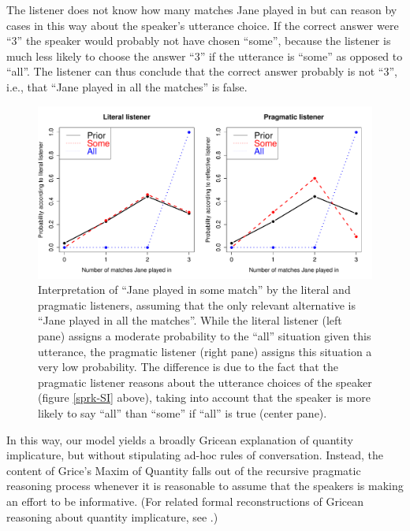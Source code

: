\documentclass[pdfextras]{handbook}
\begin{document}
The listener does not know how many matches Jane played in but can reason by cases in this way about the speaker's utterance choice. If the correct answer were ``3'' the speaker would probably not have chosen ``some'', because the listener is much less likely to choose the answer ``3'' if the utterance is ``some'' as opposed to ``all''. The listener can thus conclude that the correct answer probably is not ``3'', i.e., that ``Jane played in all the matches'' is false.
\begin{figure}[tbh]
\begin{center}
\includegraphics[scale=.4]{listeners.pdf}
\end{center}
\label{listener-SI}
\caption{Interpretation of ``Jane played in some match'' by the literal and pragmatic listeners, assuming that the only relevant alternative is ``Jane played in all the matches''. While the literal listener (left pane) assigns a moderate probability to the ``all'' situation given this utterance, the pragmatic listener (right pane) assigns this situation a very low probability. The difference is due to the fact that the pragmatic listener reasons about the utterance choices of the speaker (figure \ref{sprk-SI} above), taking into account that the speaker is more likely to say ``all'' than ``some'' if ``all'' is true (center pane).}
\end{figure}
In this way, our model yields a broadly Gricean explanation of quantity implicature, but without stipulating ad-hoc rules of conversation. Instead, the content of Grice's Maxim of Quantity falls out of the recursive pragmatic reasoning process whenever it is reasonable to assume that the speakers is making an effort to be informative. (For related formal reconstructions of Gricean reasoning about quantity implicature, see \citet{franke09,Vogel-etal:2013}.)
 

\end{document}
